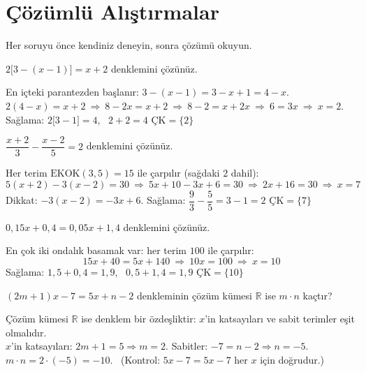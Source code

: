 \section{Çözümlü Alıştırmalar}
Her soruyu önce kendiniz deneyin, sonra çözümü okuyun.

\begin{alistirma}
\(2\big[3-(x-1)\big]=x+2\) denklemini çözünüz.
\end{alistirma}
\begin{cozum}
En içteki parantezden başlanır: \(3-(x-1)=3-x+1=4-x\).\\
\(2(4-x)=x+2\ \Rightarrow\ 8-2x=x+2\ \Rightarrow\ 8-2=x+2x\ \Rightarrow\ 6=3x\ \Rightarrow\ x=2\).\\
Sağlama: \(2\big[3-1\big]=4\), \ \(2+2=4\) \checkmark \qquad \(\text{ÇK}=\{2\}\)
\end{cozum}

\begin{alistirma}
\(\dfrac{x+2}{3}-\dfrac{x-2}{5}=2\) denklemini çözünüz.
\end{alistirma}
\begin{cozum}
Her terim \(\text{EKOK}(3,5)=15\) ile çarpılır (sağdaki \(2\) dahil):
\[5(x+2)-3(x-2)=30\ \Rightarrow\ 5x+10-3x+6=30\ \Rightarrow\ 2x+16=30\ \Rightarrow\ x=7\]
Dikkat: \(-3(x-2)=-3x+6\). \quad Sağlama: \(\dfrac{9}{3}-\dfrac{5}{5}=3-1=2\) \checkmark \qquad \(\text{ÇK}=\{7\}\)
\end{cozum}

\begin{alistirma}
\(0{,}15x+0{,}4=0{,}05x+1{,}4\) denklemini çözünüz.
\end{alistirma}
\begin{cozum}
En çok iki ondalık basamak var: her terim \(100\) ile çarpılır:
\[15x+40=5x+140\ \Rightarrow\ 10x=100\ \Rightarrow\ x=10\]
Sağlama: \(1{,}5+0{,}4=1{,}9\), \ \(0{,}5+1{,}4=1{,}9\) \checkmark \qquad \(\text{ÇK}=\{10\}\)
\end{cozum}

\begin{alistirma}
\((2m+1)x-7=5x+n-2\) denkleminin çözüm kümesi \(\mathbb{R}\) ise \(m\cdot n\) kaçtır?
\end{alistirma}
\begin{cozum}
Çözüm kümesi \(\mathbb{R}\) ise denklem bir özdeşliktir: \(x\)'in katsayıları ve sabit terimler eşit olmalıdır.\\
\(x\)'in katsayıları: \(2m+1=5\Rightarrow m=2\). \quad Sabitler: \(-7=n-2\Rightarrow n=-5\).\\
\(m\cdot n=2\cdot(-5)=-10\). \ (Kontrol: \(5x-7=5x-7\) her \(x\) için doğrudur.)
\end{cozum}

